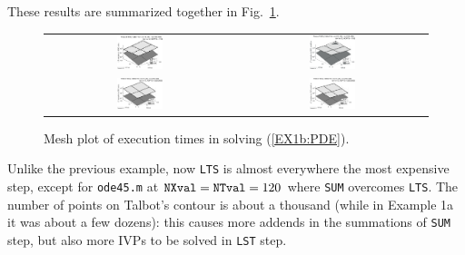 \documentclass[a4paper,10pt]{report}%
\begin{document}
These results are summarized together in Fig.~\ref{EX1b_times3D_tol4}.
\begin{figure}[htb]
\centering
\begin{tabular}{cc}
\includegraphics[width=0.25\textwidth]{./FIGS/EX1b/EX1b_times3D_tol4_1.eps} &
\includegraphics[width=0.25\textwidth]{./FIGS/EX1b/EX1b_times3D_tol4_3.eps} \\
\includegraphics[width=0.25\textwidth]{./FIGS/EX1b/EX1b_times3D_tol4_2.eps} &
\includegraphics[width=0.25\textwidth]{./FIGS/EX1b/EX1b_times3D_tol4_4.eps}
\end{tabular}
\caption{\small Mesh plot of execution times in solving (\ref{EX1b:PDE}).}
\label{EX1b_times3D_tol4}
\end{figure}

\noindent Unlike the previous example, now {\tt LTS} is almost everywhere the most expensive step, except
for {\tt ode45.m} at ${\tt NXval}={\tt NTval}=120$ where {\tt SUM} overcomes {\tt LTS}.
The number of points on Talbot's contour is about a thousand (while in Example 1a it was about a few dozens):
this causes more addends in the summations of {\tt SUM} step, but also more IVPs to be solved in {\tt LST} step.



\end{document}
